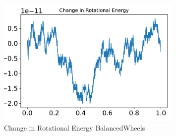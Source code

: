 \begin{figure}[htbp]\centerline{\includegraphics[width=0.80\textwidth]{AutoTeX/ChangeInRotationalEnergyBalancedWheels}}\caption{Change in Rotational Energy BalancedWheels}\label{fig:ChangeInRotationalEnergyBalancedWheels}\end{figure}